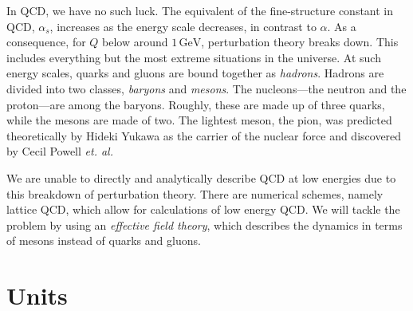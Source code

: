 In QCD, we have no such luck.
The equivalent of the fine-structure constant in QCD, $\alpha_s$, increases as the energy scale decreases, in contrast to $\alpha$.
As a consequence, for $Q$ below around $1\,\text{GeV}$, perturbation theory breaks down.
This includes everything but the most extreme situations in the universe.
At such energy scales, quarks and gluons are bound together as \emph{hadrons}.
Hadrons are divided into two classes, \emph{baryons} and \emph{mesons}.
The nucleons---the neutron and the proton---are among the baryons.
Roughly, these are made up of three quarks, while the mesons are made of two.
The lightest meson, the pion, was predicted theoretically by Hideki Yukawa as the carrier of the nuclear force and discovered by Cecil Powell \emph{et. al.}~\autocite{griffithsIntroductionElementaryParticles2008}

We are unable to directly and analytically describe QCD at low energies due to this breakdown of perturbation theory.
There are numerical schemes, namely lattice QCD, which allow for calculations of low energy QCD. 
We will tackle the problem by using an \emph{effective field theory}, which describes the dynamics in terms of mesons instead of quarks and gluons.



\section{Units}
\label{section: units}


